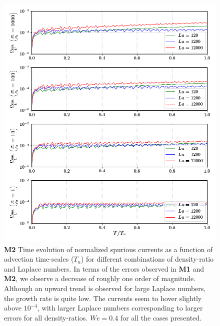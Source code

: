 \begin{figure}[h!]
    \centering
    \includegraphics[]{plots/droplet_advect/evo_sagar.png}
	\caption{\textbf{M2} Time evolution of normalized spurious currents as a function of advection time-scales ($T_u$) for different combinations of density-ratio and Laplace numbers. In terms of the errors observed in \textbf{M1} and \textbf{M2}, we observe a decrease of roughly one order of magnitude. Although an upward trend is observed for large Laplace numbers, the growth rate is quite low. The currents seem to hover slightly above $10^{-4}$, with larger Laplace numbers corresponding to larger errors for all density-ratios. $We = 0.4$ for all the cases presented.}   
    \label{evo_sagar}
\end{figure}

